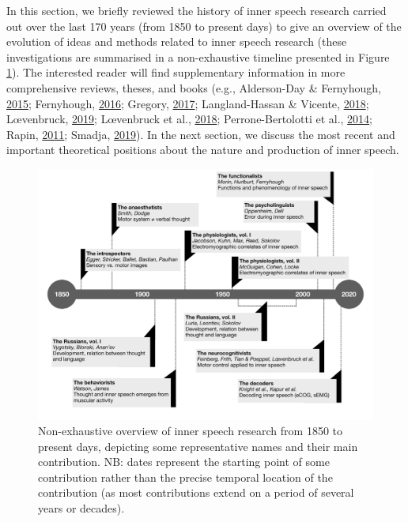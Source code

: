 \documentclass[a4paper,12pt,twoside,onecolumn,openright,final,oldfontcommands]{memoir}
\begin{document}
In this section, we briefly reviewed the history of inner speech research carried out over the last 170 years (from 1850 to present days) to give an overview of the evolution of ideas and methods related to inner speech research (these investigations are summarised in a non-exhaustive timeline presented in Figure \ref{fig:timeline}). The interested reader will find supplementary information in more comprehensive reviews, theses, and books (e.g., Alderson-Day \& Fernyhough, \protect\hyperlink{ref-alderson-day_inner_2015}{2015}; Fernyhough, \protect\hyperlink{ref-fernyhough_voices_2016}{2016}; Gregory, \protect\hyperlink{ref-gregory_inner_2017}{2017}; Langland-Hassan \& Vicente, \protect\hyperlink{ref-langland-hassan_inner_2018}{2018}; Lœvenbruck, \protect\hyperlink{ref-loevenbruck_loquor_2019}{2019}; Lœvenbruck et al., \protect\hyperlink{ref-loevenbruck_cognitive_2018}{2018}; Perrone-Bertolotti et al., \protect\hyperlink{ref-Perrone-Bertolotti2014}{2014}; Rapin, \protect\hyperlink{ref-Rapin2011}{2011}; Smadja, \protect\hyperlink{ref-smadja_parole_2019}{2019}). In the next section, we discuss the most recent and important theoretical positions about the nature and production of inner speech.

\begin{landscape}

\begin{figure}[ht]

{\centering \includegraphics[width=1\linewidth]{assets/timeline} 

}

\caption{Non-exhaustive overview of inner speech research from 1850 to present days, depicting some representative names and their main contribution. NB: dates represent the starting point of some contribution rather than the precise temporal location of the contribution (as most contributions extend on a period of several years or decades).}\label{fig:timeline}
\end{figure}

\end{landscape}
\end{document}
